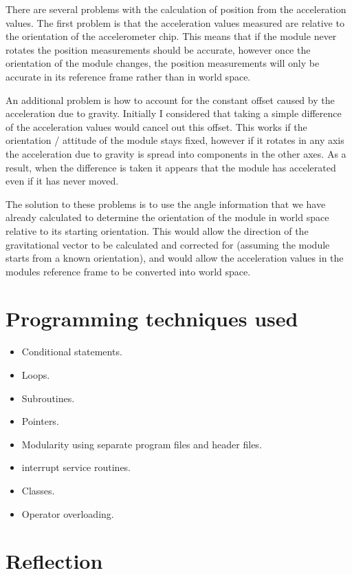 \documentclass[10pt, a4paper]{article}
\def\vs{\vspace{6pt}}
\begin{document}
\vs
There are several problems with the calculation of position from the acceleration values. The first problem is that the acceleration values measured are relative to the orientation of the accelerometer chip. This means that if the module never rotates the position measurements should be accurate, however once the orientation of the module changes, the position measurements will only be accurate in its reference frame rather than in world space.

An additional problem is how to account for the constant offset caused by the acceleration due to gravity. Initially I considered that taking a simple difference of the acceleration values would cancel out this offset. This works if the orientation / attitude of the module stays fixed, however if it rotates in any axis the acceleration due to gravity is spread into components in the other axes. As a result, when the difference is taken it appears that the module has accelerated even if it has never moved.

The solution to these problems is to use the angle information that we have already calculated to determine the orientation of the module in world space relative to its starting orientation. This would allow the direction of the gravitational vector to be calculated and corrected for (assuming the module starts from a known orientation), and would allow the acceleration values in the modules reference frame to be converted into world space.

\section{Programming techniques used}

\begin{itemize}
    \item Conditional statements.
    \item Loops.
    \item Subroutines.
    \item Pointers.
    \item Modularity using separate program files and header files.
    \item interrupt service routines.
    \item Classes.
    \item Operator overloading.
\end{itemize}

\section{Reflection}
\end{document}
